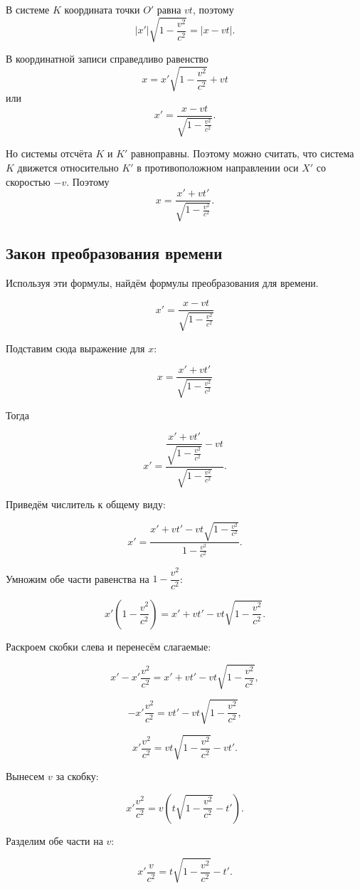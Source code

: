 \documentclass[a4paper,12pt]{article}
\begin{document}
В системе \(K\) координата точки \(O'\) равна \(vt\), поэтому
\[
|x'|\sqrt{1 - \frac{v^2}{c^2}} = |x - vt|.
\]

В координатной записи справедливо равенство
\[
x = x'\sqrt{1 - \frac{v^2}{c^2}} + vt
\]
или
\[
x' = \frac{x - vt}{\sqrt{1 - \frac{v^2}{c^2}}}.
\]

Но системы отсчёта \(K\) и \(K'\) равноправны. Поэтому можно считать, что система \(K\) движется относительно \(K'\) в противоположном направлении оси \(X'\) со скоростью \(-v\). Поэтому
\[
x = \frac{x' + vt'}{\sqrt{1 - \frac{v^2}{c^2}}}.
\]

\subsection*{Закон преобразования времени}

Используя эти формулы, найдём формулы преобразования для времени.

\[
x' = \frac{x - vt}{\sqrt{1 - \frac{v^2}{c^2}}}
\]

Подставим сюда выражение для \(x\):

\[
x = \frac{x' + vt'}{\sqrt{1 - \frac{v^2}{c^2}}}
\]

Тогда

\[
x' =
\frac{\dfrac{x' + vt'}{\sqrt{1 - \frac{v^2}{c^2}}} - vt}
{\sqrt{1 - \frac{v^2}{c^2}}}.
\]

Приведём числитель к общему виду:

\[
x' =
\frac{x' + vt' - vt\sqrt{1 - \frac{v^2}{c^2}}}
{1 - \frac{v^2}{c^2}}.
\]

Умножим обе части равенства на \(1 - \dfrac{v^2}{c^2}\):

\[
x'\left(1 - \frac{v^2}{c^2}\right)
=
x' + vt' - vt\sqrt{1 - \frac{v^2}{c^2}}.
\]

Раскроем скобки слева и перенесём слагаемые:

\[
x' - x'\frac{v^2}{c^2}
=
x' + vt' - vt\sqrt{1 - \frac{v^2}{c^2}},
\]

\[
- x'\frac{v^2}{c^2}
=
vt' - vt\sqrt{1 - \frac{v^2}{c^2}},
\]

\[
x'\frac{v^2}{c^2}
=
vt\sqrt{1 - \frac{v^2}{c^2}} - vt'.
\]

Вынесем \(v\) за скобку:

\[
x'\frac{v^2}{c^2}
=
v\left(t\sqrt{1 - \frac{v^2}{c^2}} - t'\right).
\]

Разделим обе части на \(v\):

\[
x'\frac{v}{c^2}
=
t\sqrt{1 - \frac{v^2}{c^2}} - t'.
\]
\end{document}
